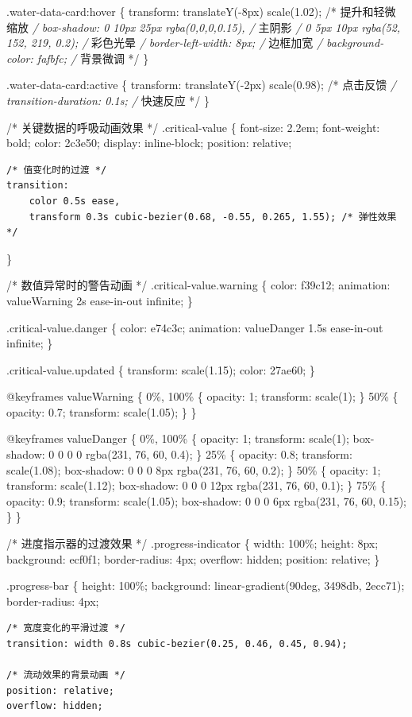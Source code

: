 .water-data-card:hover \{ transform: translateY(-8px) scale(1.02); /* 提升和轻微缩放 \emph{/ box-shadow: 0 10px 25px rgba(0,0,0,0.15), /} 主阴影 \emph{/ 0 5px 10px rgba(52, 152, 219, 0.2); /} 彩色光晕 \emph{/ border-left-width: 8px; /} 边框加宽 \emph{/ background-color: fafbfc; /} 背景微调 */ \}

.water-data-card:active \{ transform: translateY(-2px) scale(0.98); /* 点击反馈 \emph{/ transition-duration: 0.1s; /} 快速反应 */ \}

/* 关键数据的呼吸动画效果 */ .critical-value \{ font-size: 2.2em; font-weight: bold; color: 2c3e50; display: inline-block; position: relative;

\begin{verbatim}
/* 值变化时的过渡 */
transition: 
    color 0.5s ease,
    transform 0.3s cubic-bezier(0.68, -0.55, 0.265, 1.55); /* 弹性效果 */
\end{verbatim}

\}

/* 数值异常时的警告动画 */ .critical-value.warning \{ color: f39c12; animation: valueWarning 2s ease-in-out infinite; \}

.critical-value.danger \{ color: e74c3c; animation: valueDanger 1.5s ease-in-out infinite; \}

.critical-value.updated \{ transform: scale(1.15); color: 27ae60; \}

@keyframes valueWarning \{ 0\%, 100\% \{ opacity: 1; transform: scale(1); \} 50\% \{ opacity: 0.7; transform: scale(1.05); \} \}

@keyframes valueDanger \{ 0\%, 100\% \{ opacity: 1; transform: scale(1); box-shadow: 0 0 0 0 rgba(231, 76, 60, 0.4); \} 25\% \{ opacity: 0.8; transform: scale(1.08); box-shadow: 0 0 0 8px rgba(231, 76, 60, 0.2); \} 50\% \{ opacity: 1; transform: scale(1.12); box-shadow: 0 0 0 12px rgba(231, 76, 60, 0.1); \} 75\% \{ opacity: 0.9; transform: scale(1.05); box-shadow: 0 0 0 6px rgba(231, 76, 60, 0.15); \} \}

/* 进度指示器的过渡效果 */ .progress-indicator \{ width: 100\%; height: 8px; background: ecf0f1; border-radius: 4px; overflow: hidden; position: relative; \}

.progress-bar \{ height: 100\%; background: linear-gradient(90deg, 3498db, 2ecc71); border-radius: 4px;

\begin{verbatim}
/* 宽度变化的平滑过渡 */
transition: width 0.8s cubic-bezier(0.25, 0.46, 0.45, 0.94);

/* 流动效果的背景动画 */
position: relative;
overflow: hidden;
\end{verbatim}

